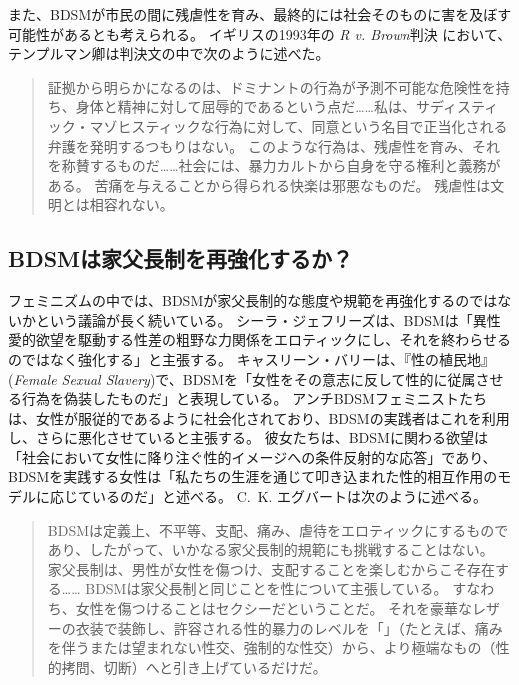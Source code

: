 \documentclass[paper=a4,book,openany]{jlreq}
\newcommand{\ig}[1]{}           %
\begin{document}
また、BDSMが市民の間に残虐性を育み、最終的には社会そのものに害を及ぼす可能性があるとも考えられる。
イギリスの1993年の \emph{R v. Brown}判決 において、テンプルマン卿は判決文の中で次のように述べた。

\begin{quote}
証拠から明らかになるのは、ドミナントの行為が予測不可能な危険性を持ち、身体と精神に対して屈辱的であるという点だ……私は、サディスティック・マゾヒスティックな行為に対して、同意という名目で正当化される弁護を発明するつもりはない。
このような行為は、残虐性を育み、それを称賛するものだ……社会には、暴力カルトから自身を守る権利と義務がある。
苦痛を与えることから得られる快楽は邪悪なものだ。
残虐性は文明とは相容れない。
\ig{(\emph{R v. Brown})}
\end{quote}

\subsection{BDSMは家父長制を再強化するか？}

フェミニズムの中では、BDSMが家父長制的な態度や規範を再強化するのではないかという議論が長く続いている。
シーラ・ジェフリーズは、BDSMは「異性愛的欲望を駆動する性差の粗野な力関係をエロティックにし、それを終わらせるのではなく強化する」と主張する\citep[p.86]{jeffreys96:_heter_desir_gender}。
キャスリーン・バリー\ig{Barry}は、『性の植民地』(\emph{Female Sexual Slavery})で、BDSMを「女性をその意志に反して性的に従属させる行為を偽装したものだ」と表現している\citep[p.209]{barry79:_femal_sexual_slaver}。
アンチBDSMフェミニストたちは、女性が服従的であるように社会化されており、BDSMの実践者はこれを利用し、さらに悪化させていると主張する。
彼女たちは、BDSMに関わる欲望は「社会において女性に降り注ぐ性的イメージへの条件反射的な応答」であり、BDSMを実践する女性は「私たちの生涯を通じて叩き込まれた性的相互作用のモデルに応じているのだ」と述べる\citep[p.139]{nichols82:_is_sadom_femin}。
C.~K. エグバートは次のように述べる。

\begin{quote}
 BDSMは定義上、不平等、支配、痛み、虐待をエロティックにするものであり、したがって、いかなる家父長制的規範にも挑戦することはない。
家父長制は、男性が女性を傷つけ、支配することを楽しむからこそ存在する…… BDSMは家父長制と同じことを性について主張している。
すなわち、女性を傷つけることはセクシーだということだ。
それを豪華なレザーの衣装で装飾し、許容される性的暴力のレベルを「」（たとえば、痛みを伴うまたは望まれない性交、強制的な性交）から、より極端なもの（性的拷問、切断）へと引き上げているだけだ。
\citep{egbert15:_bdsm_faq_frequen_asser_quibb}
\end{quote}
\end{document}
